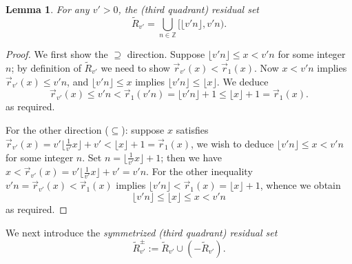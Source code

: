 \documentclass[12pt,letterpaper, reqno]{amsart}
\newtheorem{lem}[thm]{Lemma}
\theoremstyle{definition}
\theoremstyle{remark}
\newcommand{\ZZ}{\ensuremath{\mathbb{Z}}}
\newcommand{\vv}{{v'}}
\newcommand{\R}{{R}}
\newcommand{\floor}[1]{\lfloor{#1}\rfloor}
\newcommand{\ceil}[1]{\lceil{#1}\rceil}
\newcommand{\tround}{\vec{r}}
\begin{document}
\begin{lem}\label{lem:51}
 For any $\vv>0$, the (third quadrant) residual set 
\[ 
 \widetilde{\R}_\vv = \bigcup_{n\in\ZZ} \big[\textstyle \floor{{\vv} n}, \vv n \big).
\]
\end{lem}

\begin{proof}
We first show the $\supseteq$ direction. Suppose $\floor{{\vv}n}\leq x< \vv n$ for some integer $n$; 
by definition of $\widetilde{\R}_\vv$ we need to show $\vec{r}_{\vv}(x) < \vec{r}_{1}(x)$.
Now $x < \vv n$ implies $\vec{r}_{\vv}(x) \le \vv n$, and $\floor{{\vv} n} \leq x$ 
implies $\floor{{\vv} n} \leq \floor{ x}$. We deduce
\[ 
\vec{r}_{\vv}(x) \le \vv n < \tround_1(\vv n) =\floor{{\vv} n} +{1}\leq \floor{x} +{1} = \tround_1(x) .
\]
as required.

For the other direction ($\subseteq$): suppose $x$ satisfies $\tround_\vv(x) = {\vv}\floor{\frac{1}\vv x}+{\vv}<\floor{ x}+{1} = \tround_1(x)$,  we wish to deduce
$\floor{{\vv}n}\leq x< \vv n$ for some integer $n$.
Set $n = \floor{\frac1{\vv}x}+1$; then we have 
$  x<\tround_\vv(x)=\vv\floor{\frac1\vv x} + \vv = \vv n.$
For the other inequality  
${\vv}n  = \tround_\vv(x) < \tround_1(x) $
implies 
$\floor{{\vv} n} < \tround_1(x) = \floor{x}+1$, whence we obtain 
 $$ \floor{{\vv} n} \leq  \floor{x} \leq x < \vv n$$
as required.
\end{proof}

We next introduce the {\em symmetrized (third quadrant) residual set}
\[ 
\widetilde{\R}^\pm_\vv := \widetilde{\R}_\vv\cup (-\widetilde{\R}_\vv).
\]
\end{document}
